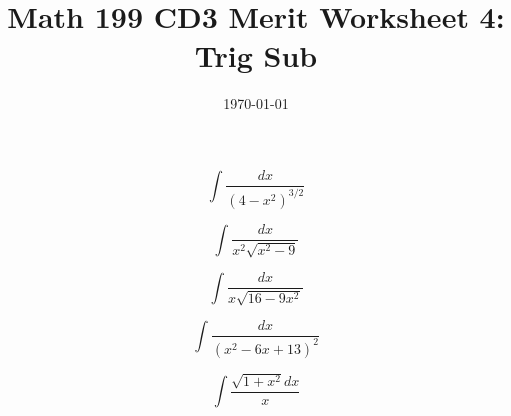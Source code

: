 
\usepackage{fullpage,amsmath,amssymb,amsthm}

\newcommand{\D}{\displaystyle}

\title{Math 199 CD3 Merit Worksheet 4:  Trig Sub }
\date{\today}




\maketitle

\be

	\item $$\int\frac{dx}{(4-x^2)^{3/2}}$$
	\vfill
	\item $$\int \frac{dx}{x^2\sqrt{x^2-9}}$$
	\vfill 
	\item $$\int \frac{dx}{x\sqrt{16-9x^2}}$$
	\vfill
	\newpage
	\item  $$\int \frac{dx}{(x^2-6x+13)^2}$$
	\vfill 
	\item $$\int \frac{\sqrt{1+x^2}dx}{x}$$
	\vfill
\ee

